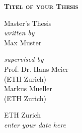 




%
%
\pagestyle{empty}

\begin{titlepage}
$ $
\vspace{1 cm}
\center

\Huge{\textbf{\textsc{Titel of your Thesis}}}
\vspace{1em}

\huge{
	Master's Thesis\\
	\vspace{2em}
}
\vspace{2em}
\large{
	\textit{written by}\\
}
\Large{
	Max Muster\\
}
\vspace{3em}

\large{
	\textit{supervised by}\\
}
\Large{
	Prof. Dr. Hans Meier\\
}
\large{
	(ETH Zurich)\\
}
\vspace{1em}
\Large{
	Markus Mueller\\
}
\large{
	(ETH Zurich)\\
}


\vspace{3em}
\large{
    ETH Zurich\\[1cm]
	\textit{enter your date here}
}

\end{titlepage}


\mbox{ }
\newpage

\setcounter{page}{1}
\pagestyle{fancy}
\fancyhead{}
\fancyfoot{}
\fancyhead[LE] {\leftmark}
\fancyhead[RO] {\rightmark}
\fancyfoot[RO,LE] {\thepage}


%
%




%
%

\mbox{ }
\thispagestyle{empty}
\newpage
\dosecttoc
\tableofcontents			

\newpage
\mbox{ }
\thispagestyle{empty}
\newpage

